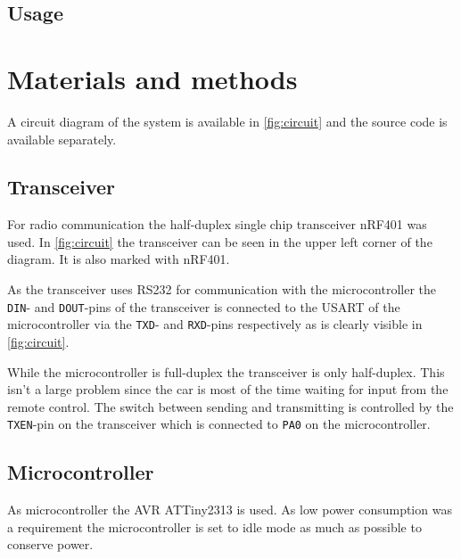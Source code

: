 \documentclass[a4paper,twoside,titlepage]{article}
\begin{document}
\subsection{Usage} %
\label{sub:usage}


\section{Materials and methods} %
\label{sec:materials_and_methods}

A circuit diagram of the system is available in \autoref{fig:circuit} and the source code is available separately. 

\subsection{Transceiver} %
\label{sub:transceiver}

For radio communication the  half-duplex single chip transceiver nRF401 was used. In \autoref{fig:circuit} the transceiver can be seen in the upper left corner of the diagram. It is also marked with nRF401.

As the transceiver uses RS232 for communication with the microcontroller the {\tt DIN}- and {\tt DOUT}-pins of the transceiver is connected to the USART of the microcontroller via the {\tt TXD}- and {\tt RXD}-pins respectively as is clearly visible in \autoref{fig:circuit}.

While the microcontroller is full-duplex the transceiver is only half-duplex. This isn't a large problem since the car is most of the time waiting for input from the remote control. The switch between sending and transmitting is controlled by the {\tt TXEN}-pin on the transceiver which is connected to {\tt PA0} on the microcontroller.


\subsection{Microcontroller} %
\label{sub:microcontroller}

As microcontroller the AVR ATTiny2313 is used. As low power consumption was a requirement the microcontroller is set to idle mode as much as possible to conserve power.
\end{document}
